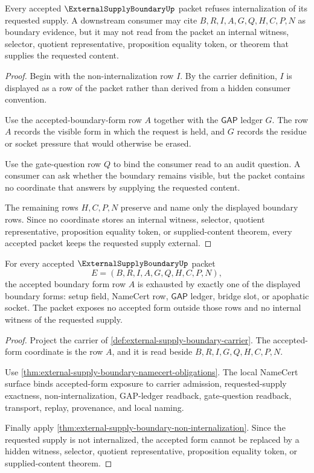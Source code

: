 \begin{theorem}
\label{thm:external-supply-boundary-non-internalization}
Every accepted $\ExternalSupplyBoundaryUp$ packet refuses internalization of its requested supply. A downstream consumer may cite $B,R,I,A,G,Q,H,C,P,N$ as boundary evidence, but it may not read from the packet an internal witness, selector, quotient representative, proposition equality token, or theorem that supplies the requested content.
\end{theorem}
\begin{proof}
Begin with the non-internalization row $I$. By the carrier definition, $I$ is displayed as a row of the packet rather than derived from a hidden consumer convention.

Use the accepted-boundary-form row $A$ together with the $\mathsf{GAP}$ ledger $G$. The row $A$ records the visible form in which the request is held, and $G$ records the residue or socket pressure that would otherwise be erased.

Use the gate-question row $Q$ to bind the consumer read to an audit question. A consumer can ask whether the boundary remains visible, but the packet contains no coordinate that answers by supplying the requested content.

The remaining rows $H,C,P,N$ preserve and name only the displayed boundary rows. Since no coordinate stores an internal witness, selector, quotient representative, proposition equality token, or supplied-content theorem, every accepted packet keeps the requested supply external.
\end{proof}

\begin{theorem}
\label{thm:external-supply-boundary-accepted-form-exhaustion}
For every accepted $\ExternalSupplyBoundaryUp$ packet
$$
E=(B,R,I,A,G,Q,H,C,P,N),
$$
the accepted boundary form row $A$ is exhausted by exactly one of the displayed
boundary forms: setup field, NameCert row, $\mathsf{GAP}$ ledger, bridge slot,
or apophatic socket. The packet exposes no accepted form outside those rows
and no internal witness of the requested supply.
\end{theorem}
\begin{proof}
Project the carrier of \autoref{def:external-supply-boundary-carrier}. The
accepted-form coordinate is the row $A$, and it is read beside
$B,R,I,G,Q,H,C,P,N$.

Use \autoref{thm:external-supply-boundary-namecert-obligations}. The local
NameCert surface binds accepted-form exposure to carrier admission,
requested-supply exactness, non-internalization, GAP-ledger readback,
gate-question readback, transport, replay, provenance, and local naming.

Finally apply \autoref{thm:external-supply-boundary-non-internalization}. Since
the requested supply is not internalized, the accepted form cannot be replaced
by a hidden witness, selector, quotient representative, proposition equality
token, or supplied-content theorem.
\end{proof}

